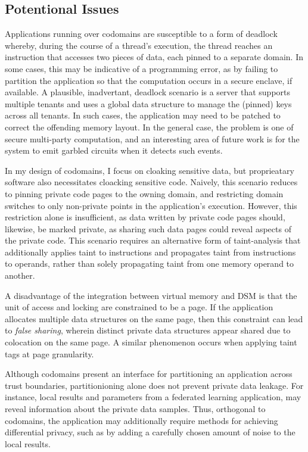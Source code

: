 \subsection{Potentional Issues}

%
Applications running over codomains are susceptible to a form of deadlock
whereby, during the course of a thread's execution, the thread reaches an
instruction that accesses two pieces of data, each pinned to a separate domain.
%
In some cases, this may be indicative of a programming error, as by failing to
partition the application so that the computation occurs in a secure enclave,
if available.
%
A plausible, inadvertant, deadlock scenario is a server that supports multiple
tenants and uses a global data structure to manage the (pinned) keys across all
tenants.
%
In such cases, the application may need to be patched to correct the offending
memory layout.
%
In the general case, the problem is one of secure multi-party computation, and
an interesting area of future work is for the system to emit garbled circuits
when it detects such events.


%
In my design of codomains, I focus on cloaking sensitive data, but
proprieatary software also necessitates cloacking sensitive code.
%
Naively, this scenario reduces to pinning private code pages to
the owning domain, and restricting domain switches to only
non-private points in the application's execution.
%
However, this restriction alone is insufficient, as data written by private
code pages should, likewise, be marked private, as sharing such data pages
could reveal aspects of the private code.
%
This scenario requires an alternative form of taint-analysis that additionally
applies taint to instructions and propagates taint from instructions to
operands, rather than solely propagating taint from one memory operand to
another.


%
A disadvantage of the integration between virtual memory and DSM is that the
unit of access and locking are constrained to be a page.
%
If the application allocates multiple data structures on the same page, then
this constraint can lead to \emph{false sharing}, wherein distinct private data
structures appear shared due to colocation on the same page.
%
A similar phenomenon occurs when applying taint tags at page granularity.


%
Although codomains present an interface for partitioning an application across
trust boundaries, partitionioning alone does not prevent private data leakage.
%
For instance, local results and parameters from a federated learning
application, may reveal information about the private data samples.
%
Thus, orthogonal to codomains, the application may additionally require
methods for achieving differential privacy, such as by adding a carefully
chosen amount of noise to the local results.



